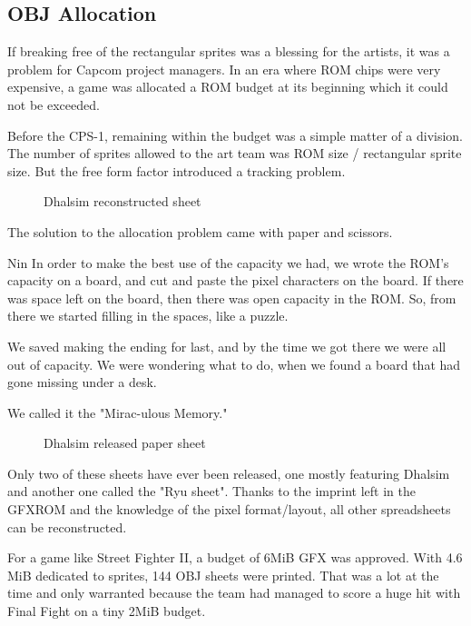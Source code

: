 \subsection{OBJ Allocation}

If breaking free of the rectangular sprites was a blessing for the artists, it was a problem for Capcom project managers. In an era where ROM chips were very expensive, a game was allocated a ROM budget at its beginning which it could not be exceeded.


Before the CPS-1, remaining within the budget was a simple matter of a division. The number of sprites allowed to the art team was ROM size / rectangular sprite size. But the free form factor introduced a tracking problem.



 \begin{figure}[H]
\caption*{Dhalsim reconstructed sheet}
\end{figure}

The solution to the allocation problem came with paper and scissors.

\begin{q}{Nin\cite{sf2devinterview}}
In order to make the best use of the capacity we had, we wrote the ROM’s capacity on a board, and cut and paste the pixel characters on the board. If there was space left on the board, then there was open capacity in the ROM. So, from there we started filling in the spaces, like a puzzle. 

We saved making the ending for last, and by the time we got there we were all out of capacity. We were wondering what to do, when we found a board that had gone missing under a desk.

We called it the "Mirac-ulous Memory."
\end{q}



 \begin{figure}[H]
\caption*{Dhalsim released paper sheet}
\end{figure}

Only two of these sheets have ever been released, one mostly featuring Dhalsim\cite{ffdevinterview} and another one called the "Ryu sheet"\cite{htmcc}. Thanks to the imprint left in the GFXROM and the knowledge of the pixel format/layout, all other spreadsheets can be reconstructed. 



For a game like Street Fighter II, a budget of 6MiB GFX was approved. With 4.6 MiB dedicated to sprites, 144 OBJ sheets were printed. That was a lot at the time and only warranted because the team had managed to score a huge hit with Final Fight on a tiny 2MiB budget\cite{gameMaestro4}. 




